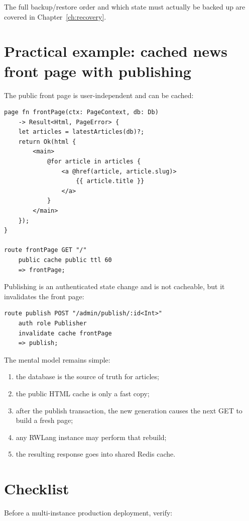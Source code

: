The full backup/restore order and which state must actually be backed up are covered in Chapter~\ref{ch:recovery}.

\section{Practical example: cached news front page with publishing}

The public front page is user-independent and can be cached:

\begin{lstlisting}[language=RWLang]
page fn frontPage(ctx: PageContext, db: Db)
    -> Result<Html, PageError> {
    let articles = latestArticles(db)?;
    return Ok(html {
        <main>
            @for article in articles {
                <a @href(article, article.slug)>
                    {{ article.title }}
                </a>
            }
        </main>
    });
}

route frontPage GET "/"
    public cache public ttl 60
    => frontPage;
\end{lstlisting}

Publishing is an authenticated state change and is not cacheable, but it invalidates the front page:

\begin{lstlisting}[language=RWLang]
route publish POST "/admin/publish/:id<Int>"
    auth role Publisher
    invalidate cache frontPage
    => publish;
\end{lstlisting}

The mental model remains simple:

\begin{enumerate}
  \item the database is the source of truth for articles;
  \item the public HTML cache is only a fast copy;
  \item after the publish transaction, the new generation causes the next GET to build a fresh page;
  \item any RWLang instance may perform that rebuild;
  \item the resulting response goes into shared Redis cache.
\end{enumerate}

\section{Checklist}

Before a multi-instance production deployment, verify:

